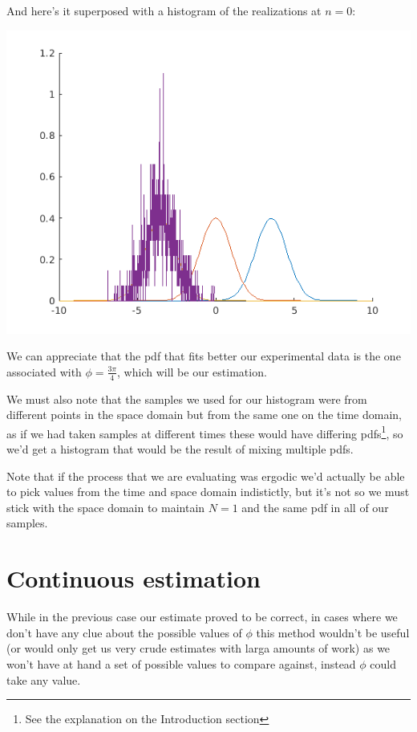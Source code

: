\documentclass[conference,9pt]{IEEEtran}
\begin{document}
And here's it superposed with a histogram of the realizations at $n=0$:


\includegraphics[scale=0.6]{4}

We can appreciate that the pdf that fits better our experimental data is the one associated with $\phi=\frac{3\pi}{4}$, which will be our estimation.

We must also note that the samples we used for our histogram were from different points in the space domain but from the same one on the time domain, as if we had taken samples at different times these would have differing pdfs\footnote{See the explanation on the Introduction section}, so we'd get a histogram that would be the result of mixing multiple pdfs.

Note that if the process that we are evaluating was ergodic we'd actually be able to pick values from the time and space domain indistictly, but it's not so we must stick with the space domain to maintain $N=1$ and the same pdf in all of our samples.

\section{Continuous estimation}

While in the previous case our estimate proved to be correct, in cases where we don't have any clue about the possible values of $\phi$ this method wouldn't be useful (or would only get us very crude estimates with larga amounts of work) as we won't have at hand a set of possible values to compare against, instead $\phi$ could take any value.
\end{document}
